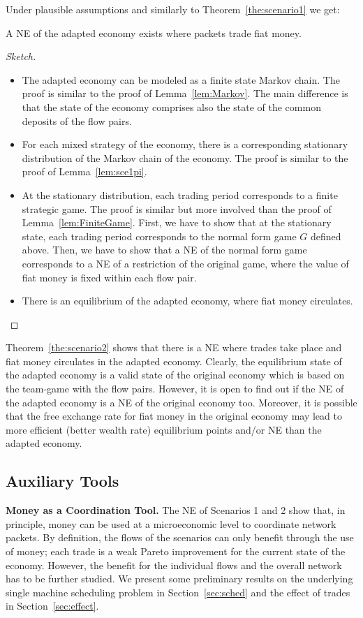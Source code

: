 \documentclass[letterpaper,10pt]{llncs}
\newcommand{\hla}[1]{\hl{#1}}
\renewcommand{\hla}[1]{#1}
\begin{document}
Under plausible assumptions and similarly to Theorem~\ref{the:scenario1} we get:
\begin{theorem}
\label{the:scenario2}
A NE of the adapted economy exists where packets trade fiat money.
\end{theorem}
\begin{proof}[Sketch]
\begin{itemize}
\item The adapted economy can be modeled as a finite state Markov chain. The proof is similar to the proof of Lemma~\ref{lem:Markov}. The main difference is that the state of the economy comprises also the state of the common deposits of the flow pairs.
\item For each mixed strategy of the economy, there is a corresponding stationary distribution of the Markov chain of the economy. The proof is similar to the proof of Lemma~\ref{lem:sce1pi}. 
\item At the stationary distribution, each trading period corresponds to a finite strategic game.
The proof is similar but more involved than the proof of Lemma~\ref{lem:FiniteGame}.
\hla{First, we have to show that at the stationary state, each trading period corresponds to the 
normal form game $G$ defined above. Then, we have to show that a NE of the normal form game 
corresponds to a NE of a restriction of the original game, where the value of fiat money
is fixed within each flow pair.}
\item There is an equilibrium of the adapted economy, where fiat money circulates.
\end{itemize}
\end{proof}

Theorem~\ref{the:scenario2} \hla{shows that there is a NE where trades take place and fiat money 
circulates in the adapted economy. Clearly, the equilibrium state of the adapted economy is 
a valid state of the original economy which is based on the team-game with the flow pairs. 
However, it is open to find out if the NE of the adapted economy is a NE of the original economy too.
Moreover, it is possible that the free exchange rate for fiat money in the original economy may lead to more efficient (better wealth rate) equilibrium points and/or NE than the adapted economy.}

\subsection{Auxiliary Tools}

\noindent
{\bf Money as a Coordination Tool.}
The NE of Scenarios 1 and 2 show that, in principle, money can be used at a microeconomic 
level to coordinate network packets. By definition, the flows of the scenarios can only benefit through the use of money; each trade is a weak Pareto improvement for the current state of the economy.
However, the benefit for the individual flows and the overall network has to
be further studied. We present some preliminary results on the underlying single 
machine scheduling problem in Section~\ref{sec:sched} and the effect of trades in Section~\ref{sec:effect}.
\end{document}
